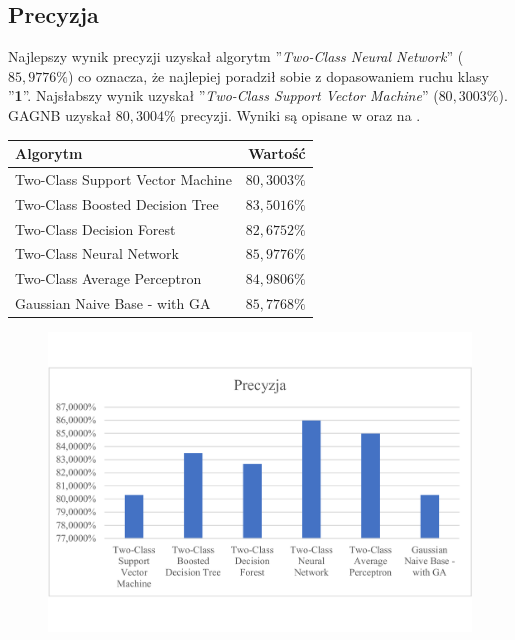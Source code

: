 \subsection{Precyzja}
Najlepszy wynik precyzji uzyskał algorytm ''\textit{Two-Class Neural Network}'' ($85,9776\%$) co oznacza, że najlepiej poradził sobie z dopasowaniem ruchu klasy ''\textbf{1}''. Najsłabszy wynik uzyskał ''\textit{Two-Class Support Vector Machine}'' ($80,3003\%$). GAGNB uzyskał $80,3004\%$ precyzji. Wyniki są opisane w  oraz na .

\begin{table}[H]
    \centering
    \begin{tabular}{|l|r|} \hline
    \textbf{Algorytm} & \textbf{Wartość} \\ \hline
    Two-Class Support Vector Machine & $80,3003\%$ \\ \hline
    Two-Class Boosted Decision Tree & $83,5016\%$ \\ \hline
    Two-Class Decision Forest & $82,6752\%$ \\ \hline
    Two-Class Neural Network & $85,9776\%$ \\ \hline
    Two-Class Average Perceptron & $84,9806\%$ \\ \hline
    Gaussian Naive Base - with GA & $85,7768\%$ \\ \hline
    \end{tabular}
    \label{tab:acc-prec}
\end{table}

\begin{figure}[H]
    \centering
    \includegraphics[width=\textwidth]{images/prec-res}
    \label{fig:acc-prec}
\end{figure}

